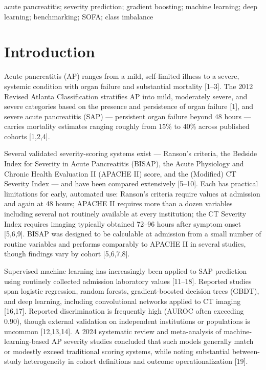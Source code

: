 \documentclass[twoside,11pt]{article}
\begin{document}
\begin{keywords}
  acute pancreatitis; severity prediction; gradient boosting; machine learning; deep learning; benchmarking; SOFA; class imbalance
\end{keywords}

\section{Introduction}

Acute pancreatitis (AP) ranges from a mild, self-limited illness to a severe, systemic condition with organ failure and substantial mortality [1--3]. The 2012 Revised Atlanta Classification stratifies AP into mild, moderately severe, and severe categories based on the presence and persistence of organ failure [1], and severe acute pancreatitis (SAP) --- persistent organ failure beyond 48 hours --- carries mortality estimates ranging roughly from 15\% to 40\% across published cohorts [1,2,4].

Several validated severity-scoring systems exist --- Ranson's criteria, the Bedside Index for Severity in Acute Pancreatitis (BISAP), the Acute Physiology and Chronic Health Evaluation II (APACHE II) score, and the (Modified) CT Severity Index --- and have been compared extensively [5--10]. Each has practical limitations for early, automated use: Ranson's criteria require values at admission and again at 48 hours; APACHE II requires more than a dozen variables including several not routinely available at every institution; the CT Severity Index requires imaging typically obtained 72--96 hours after symptom onset [5,6,9]. BISAP was designed to be calculable at admission from a small number of routine variables and performs comparably to APACHE II in several studies, though findings vary by cohort [5,6,7,8].

Supervised machine learning has increasingly been applied to SAP prediction using routinely collected admission laboratory values [11--18]. Reported studies span logistic regression, random forests, gradient-boosted decision trees (GBDT), and deep learning, including convolutional networks applied to CT imaging [16,17]. Reported discrimination is frequently high (AUROC often exceeding 0.90), though external validation on independent institutions or populations is uncommon [12,13,14]. A 2024 systematic review and meta-analysis of machine-learning-based AP severity studies concluded that such models generally match or modestly exceed traditional scoring systems, while noting substantial between-study heterogeneity in cohort definitions and outcome operationalization [19].
\end{document}
